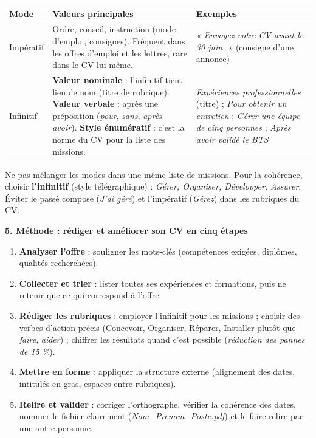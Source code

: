\documentclass[11pt]{article}
\newcommand{\cle}[1]{{\popxbold\color{popdark}#1}}
\begin{document}
\begin{center}
\begin{tabularx}{\linewidth}{|l|X|X|}\hline
\rowcolor{popgreenL}
\textbf{Mode} & \textbf{Valeurs principales} & \textbf{Exemples} \\\hline
\cle{Impératif} & Ordre, conseil, instruction (mode d'emploi, consignes). Fréquent dans les offres d'emploi et les lettres, rare dans le CV lui-même. & \emph{« Envoyez votre CV avant le 30 juin. »} (consigne d'une annonce) \\\hline
\cle{Infinitif} & \textbf{Valeur nominale} : l'infinitif tient lieu de nom (titre de rubrique). \textbf{Valeur verbale} : après une préposition (\emph{pour}, \emph{sans}, \emph{après avoir}). \textbf{Style énumératif} : c'est la norme du CV pour la liste des missions. & \emph{Expériences professionnelles} (titre) ; \emph{Pour obtenir un entretien} ; \emph{Gérer une équipe de cinq personnes} ; \emph{Après avoir validé le BTS} \\\hline
\end{tabularx}
\end{center}

\begin{attention}
Ne pas mélanger les modes dans une même liste de missions. Pour la cohérence, choisir \textbf{l'infinitif} (style télégraphique) : \emph{Gérer, Organiser, Développer, Assurer}. Éviter le passé composé (\emph{J'ai géré}) et l'impératif (\emph{Gérez}) dans les rubriques du CV.
\end{attention}

\textbf{5. Méthode : rédiger et améliorer son CV en cinq étapes}\par

\begin{methode}
\begin{enumerate}
    \item \textbf{Analyser l'offre} : souligner les mots-clés (compétences exigées, diplômes, qualités recherchées).
    \item \textbf{Collecter et trier} : lister toutes ses expériences et formations, puis ne retenir que ce qui correspond à l'offre.
    \item \textbf{Rédiger les rubriques} : employer l'infinitif pour les missions ; choisir des verbes d'action précis (\cle{Concevoir}, \cle{Organiser}, \cle{Réparer}, \cle{Installer} plutôt que \emph{faire}, \emph{aider}) ; chiffrer les résultats quand c'est possible (\emph{réduction des pannes de 15 \%}).
    \item \textbf{Mettre en forme} : appliquer la structure externe (alignement des dates, intitulés en gras, espaces entre rubriques).
    \item \textbf{Relire et valider} : corriger l'orthographe, vérifier la cohérence des dates, nommer le fichier clairement (\emph{Nom\_Prenom\_Poste.pdf}) et le faire relire par une autre personne.
\end{enumerate}
\end{methode}
\end{document}

